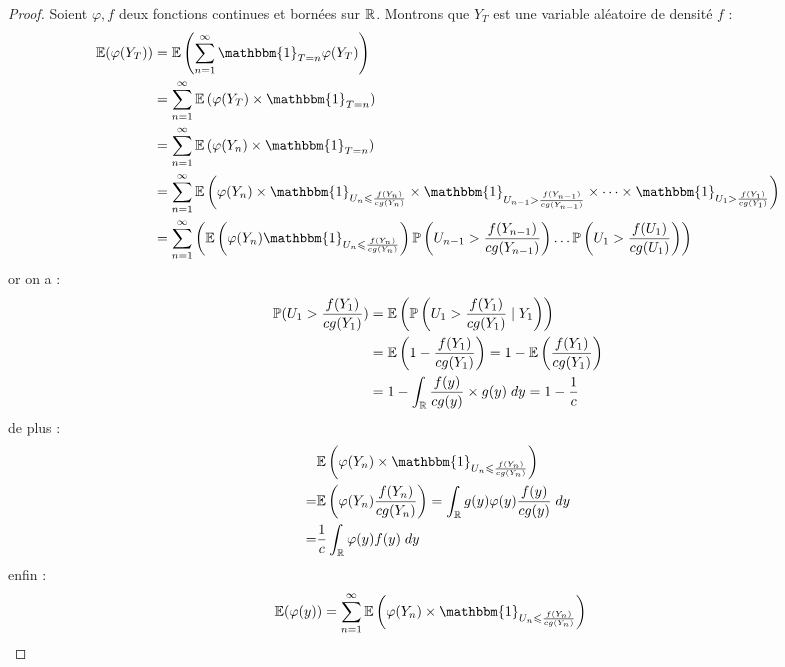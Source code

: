 \begin{proof}
    Soient $ \varphi, f$ deux fonctions continues et bornées sur $\mathbb{R}$. Montrons que $Y_T$ est une variable aléatoire 
    de densité $f$ : 
        \begin{align*}
            \mathbb{E}( \varphi(Y_T)) &= \mathbb{E} \left( \sum_{n =1}^{\infty} \mathbbm{1}_{T = n} \varphi(Y_T)  \right) \\ 
            &= \sum_{n=1}^{\infty} \mathbb{E} \left( \varphi(Y_T) \times \mathbbm{1}_{T = n}  \right) \\ 
            &= \sum_{n=1}^{\infty} \mathbb{E} \left( \varphi(Y_n) \times \mathbbm{1}_{T = n}  \right)  \\ 
            &= \sum_{n=1}^{\infty} \mathbb{E} \left( \varphi(Y_n) \times \mathbbm{1}_{U_n \leqslant \frac{f(Y_n)}{cg(Y_n)}} 
                \times \mathbbm{1}_{U_{n-1} > \frac{f(Y_{n-1})}{cg(Y_{n-1})}} \times \dots \times  
                \mathbbm{1}_{U_1 > \frac{f(Y_1)}{cg(Y_1)}}   \right)  \\
            &= \sum_{n=1}^{\infty} \left( \mathbb{E} \left( \varphi(Y_n) \mathbbm{1}_{U_n \leqslant \frac{f(Y_n)}{cg(Y_n)}} \right)
                 \myP \left( U_{n-1} > \frac{f(Y_{n-1})}{cg(Y_{n-1})} \right) \dots \myP \left(U_1 > \frac{f(U_1)}{cg(U_1)} \right) \right)
        \end{align*}
    or on a : 
        \begin{align*}
            \mathbb{P}( U_1 > \frac{f(Y_1)}{cg(Y_1)} ) &= \mathbb{E} \left( \mathbb{P} \left( U_1 > \frac{f(Y_1)}{cg(Y_1)}  \; | \; Y_1\right) \right) \\ 
            &= \mathbb{E} \left( 1 - \frac{f(Y_1)}{cg(Y_1)} \right) = 1 - \mathbb{E} \left( \frac{f(Y_1)}{cg(Y_1)} \right) \\ 
            &= 1 - \int_{\mathbb{R}} \frac{f(y)}{cg(y)} \times g(y) \; dy = 1 - \frac{1}{c} 
        \end{align*}
    de plus : 
        \begin{align*}
            & \mathbb{E} \left( \varphi(Y_n) \times \mathbbm{1}_{U_n \leqslant \frac{f(Y_n)}{cg(Y_n)} }  \right) \\ 
            = & \mathbb{E} \left( \varphi(Y_n) \frac{f(Y_n)}{cg(Y_n)} \right) = \int_\R g(y) \varphi(y) \frac{f(y)}{cg(y)} \; dy \\ 
            = & \frac{1}{c} \int_\R \varphi(y) f(y) \; dy     
        \end{align*}
    enfin : 
        \begin{align*}
            \mathbb{E}( \varphi(y)) &= \sum_{n=1}^{\infty} \mathbb{E} \left( \varphi(Y_n) \times \mathbbm{1}_{U_n \leqslant \frac{f(Y_n)}{cg(Y_n)} }  \right) 

\end{align*}
\end{proof}

